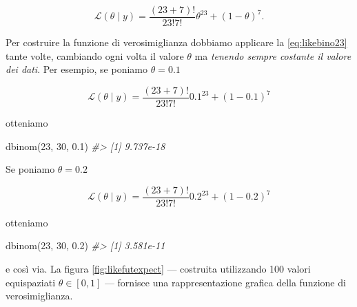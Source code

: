 \documentclass[
  11pt,
]{krantz}
\makeatletter
\newenvironment{Shaded}{\begin{snugshade}}{\end{snugshade}}
\newcommand{\CommentTok}[1]{\textcolor[rgb]{0.37,0.37,0.37}{\textit{#1}}}
\newcommand{\DecValTok}[1]{\textcolor[rgb]{0.06,0.06,0.06}{#1}}
\newcommand{\FloatTok}[1]{\textcolor[rgb]{0.06,0.06,0.06}{#1}}
\newcommand{\FunctionTok}[1]{\textcolor[rgb]{0,0,0}{#1}}
\newcommand{\NormalTok}[1]{#1}
\newenvironment{kframe}{%
\medskip{}
\setlength{\fboxsep}{.8em}
 \def\at@end@of@kframe{}%
 \ifinner\ifhmode%
  \def\at@end@of@kframe{\end{minipage}}%
  \begin{minipage}{\columnwidth}%
 \fi\fi%
 \def\FrameCommand##1{\hskip\@totalleftmargin \hskip-\fboxsep
 \colorbox{shadecolor}{##1}\hskip-\fboxsep
     \hskip-\linewidth \hskip-\@totalleftmargin \hskip\columnwidth}%
 \MakeFramed {\advance\hsize-\width
   \@totalleftmargin\z@ \linewidth\hsize
   \@setminipage}}%
 {\par\unskip\endMakeFramed%
 \at@end@of@kframe}
\renewenvironment{Shaded}{\begin{kframe}}{\end{kframe}}
\theoremstyle{definition}
\theoremstyle{definition}
\theoremstyle{definition}
\theoremstyle{definition}
\theoremstyle{remark}
\makeatother
\begin{document}
\begin{equation}
\mathcal{L}(\theta \mid y) = \frac{(23 + 7)!}{23!7!} \theta^{23} + (1-\theta)^7.
\label{eq:likebino23}
\end{equation}

Per costruire la funzione di verosimiglianza dobbiamo applicare la \eqref{eq:likebino23} tante volte, cambiando ogni volta il valore \(\theta\) ma \emph{tenendo sempre costante il valore dei dati}. Per esempio, se poniamo \(\theta = 0.1\)

\[
\mathcal{L}(\theta \mid y) = \frac{(23 + 7)!}{23!7!} 0.1^{23} + (1-0.1)^7
\]

otteniamo

\begin{Shaded}
\begin{Highlighting}[]
\FunctionTok{dbinom}\NormalTok{(}\DecValTok{23}\NormalTok{, }\DecValTok{30}\NormalTok{, }\FloatTok{0.1}\NormalTok{)}
\CommentTok{\#\textgreater{} [1] 9.737e{-}18}
\end{Highlighting}
\end{Shaded}

Se poniamo \(\theta = 0.2\)

\[
\mathcal{L}(\theta \mid y) = \frac{(23 + 7)!}{23!7!} 0.2^{23} + (1-0.2)^7
\]

otteniamo

\begin{Shaded}
\begin{Highlighting}[]
\FunctionTok{dbinom}\NormalTok{(}\DecValTok{23}\NormalTok{, }\DecValTok{30}\NormalTok{, }\FloatTok{0.2}\NormalTok{)}
\CommentTok{\#\textgreater{} [1] 3.581e{-}11}
\end{Highlighting}
\end{Shaded}

e così via. La figura \ref{fig:likefutexpect} --- costruita utilizzando 100 valori equispaziati \(\theta \in [0, 1]\) --- fornisce una rappresentazione grafica della funzione di verosimiglianza.
\end{document}
